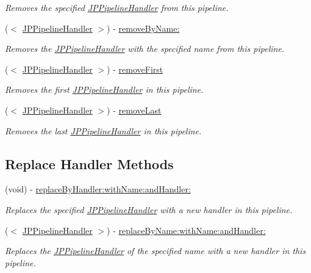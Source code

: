 \begin{DoxyCompactItemize}
\begin{DoxyCompactList}\small\item\em Removes the specified \hyperlink{a00029}{JPPipelineHandler} from this pipeline. \item\end{DoxyCompactList}\item 
($<$ \hyperlink{a00029}{JPPipelineHandler} $>$) -\/ \hyperlink{a00019_aa7e27fa3a179bac1ab1aabaf779242b2}{removeByName:}
\begin{DoxyCompactList}\small\item\em Removes the \hyperlink{a00029}{JPPipelineHandler} with the specified name from this pipeline. \item\end{DoxyCompactList}\item 
($<$ \hyperlink{a00029}{JPPipelineHandler} $>$) -\/ \hyperlink{a00019_a81f7fa81d3aa6ad17e6129aa43ffe50e}{removeFirst}
\begin{DoxyCompactList}\small\item\em Removes the first \hyperlink{a00029}{JPPipelineHandler} in this pipeline. \item\end{DoxyCompactList}\item 
($<$ \hyperlink{a00029}{JPPipelineHandler} $>$) -\/ \hyperlink{a00019_a5d37aad9a88aa1da1505551c7c016e31}{removeLast}
\begin{DoxyCompactList}\small\item\em Removes the last \hyperlink{a00029}{JPPipelineHandler} in this pipeline. \item\end{DoxyCompactList}\end{DoxyCompactItemize}
\subsection*{Replace Handler Methods}
\begin{DoxyCompactItemize}
\item 
\hypertarget{a00019_a62c67fe5640ae0c53d564c945c77cde4}{
(void) -\/ \hyperlink{a00019_a62c67fe5640ae0c53d564c945c77cde4}{replaceByHandler:withName:andHandler:}}
\label{a00019_a62c67fe5640ae0c53d564c945c77cde4}

\begin{DoxyCompactList}\small\item\em Replaces the specified \hyperlink{a00029}{JPPipelineHandler} with a new handler in this pipeline. \item\end{DoxyCompactList}\item 
($<$ \hyperlink{a00029}{JPPipelineHandler} $>$) -\/ \hyperlink{a00019_a0030320bff9a07a4bda92076de0331e7}{replaceByName:withName:andHandler:}
\begin{DoxyCompactList}\small\item\em Replaces the \hyperlink{a00029}{JPPipelineHandler} of the specified name with a new handler in this pipeline. \item\end{DoxyCompactList}\end{DoxyCompactItemize}
